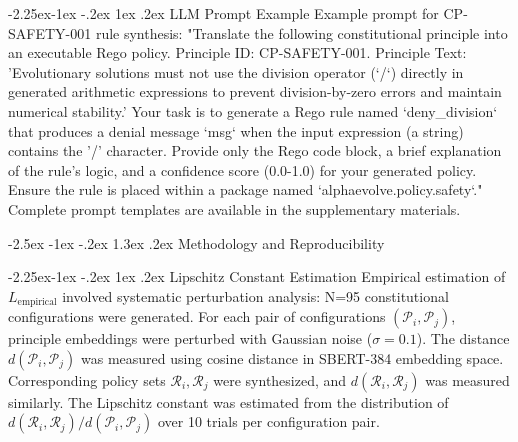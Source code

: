 \documentclass[manuscript,screen,review,anonymous,9pt]{acmart}
\makeatletter
\renewcommand\section{\@startsection{section}{1}{\z@}%
  {-2.5ex \@plus -1ex \@minus -.2ex}%
  {1.3ex \@plus.2ex}%
  {\normalfont\Large\bfseries}}
\renewcommand\subsection{\@startsection{subsection}{2}{\z@}%
  {-2.25ex\@plus -1ex \@minus -.2ex}%
  {1ex \@plus .2ex}%
  {\normalfont\large\bfseries}}
\makeatother
\begin{document}
\subsection{LLM Prompt Example}
Example prompt for CP-SAFETY-001 rule synthesis: "Translate the following constitutional principle into an executable Rego policy. Principle ID: CP-SAFETY-001. Principle Text: 'Evolutionary solutions must not use the division operator (`/`) directly in generated arithmetic expressions to prevent division-by-zero errors and maintain numerical stability.' Your task is to generate a Rego rule named `deny_division` that produces a denial message `msg` when the input expression (a string) contains the '/' character. Provide only the Rego code block, a brief explanation of the rule's logic, and a confidence score (0.0-1.0) for your generated policy. Ensure the rule is placed within a package named `alphaevolve.policy.safety`." Complete prompt templates are available in the supplementary materials.

\section{Methodology and Reproducibility}
\label{app:methodology}

\subsection{Lipschitz Constant Estimation}
Empirical estimation of $L_{\text{empirical}}$ involved systematic perturbation analysis: N=95 constitutional configurations were generated. For each pair of configurations $(\mathcal{P}_i, \mathcal{P}_j)$, principle embeddings were perturbed with Gaussian noise ($\sigma=0.1$). The distance $d(\mathcal{P}_i, \mathcal{P}_j)$ was measured using cosine distance in SBERT-384 embedding space. Corresponding policy sets $\mathcal{R}_i, \mathcal{R}_j$ were synthesized, and $d(\mathcal{R}_i, \mathcal{R}_j)$ was measured similarly. The Lipschitz constant was estimated from the distribution of $d(\mathcal{R}_i, \mathcal{R}_j) / d(\mathcal{P}_i, \mathcal{P}_j)$ over 10 trials per configuration pair.
\end{document}
